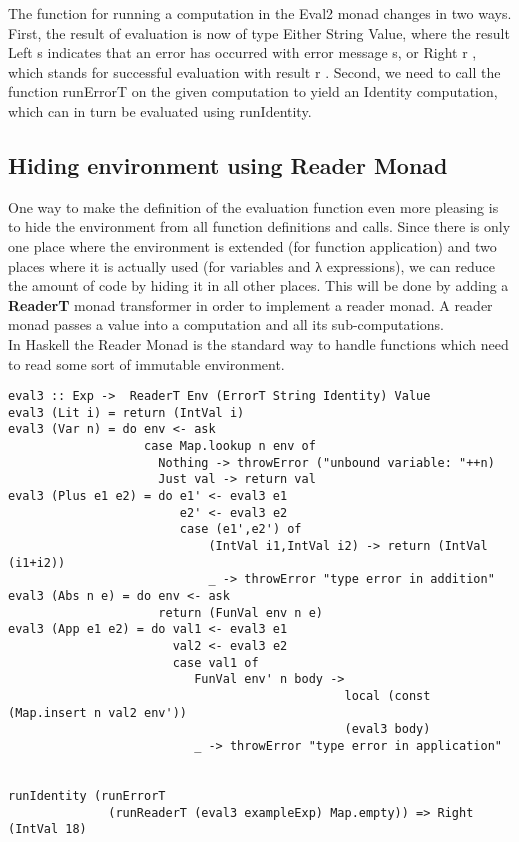 \documentclass[a4paper,10pt]{article}
\begin{document}

The function for running a computation in the Eval2 monad changes in two ways. First,
the result of evaluation is now of type Either String Value, where the result Left s indicates that an
error has occurred with error message s, or Right r , which stands for successful evaluation with
result r . Second, we need to call the function runErrorT on the given computation to yield an
Identity computation, which can in turn be evaluated using runIdentity.
\\

\newpage
\subsection{Hiding environment using Reader Monad}
One way to make the definition of the evaluation function even more pleasing is to hide the
environment from all function definitions and calls. Since there is only one place where the
environment is extended (for function application) and two places where it is actually used (for
variables and λ expressions), we can reduce the amount of code by hiding it in all other places.
This will be done by adding a \textbf{ReaderT} monad transformer in order to implement a reader
monad. A reader monad passes a value into a computation and all its sub-computations.
\\
In Haskell the Reader Monad is the standard way to handle functions which need to read some sort of immutable environment.

\begin{verbatim}
eval3 :: Exp ->  ReaderT Env (ErrorT String Identity) Value 
eval3 (Lit i) = return (IntVal i)
eval3 (Var n) = do env <- ask
                   case Map.lookup n env of
                     Nothing -> throwError ("unbound variable: "++n) 
                     Just val -> return val
eval3 (Plus e1 e2) = do e1' <- eval3 e1
                        e2' <- eval3 e2
                        case (e1',e2') of
                            (IntVal i1,IntVal i2) -> return (IntVal (i1+i2))
                            _ -> throwError "type error in addition"
eval3 (Abs n e) = do env <- ask
                     return (FunVal env n e)
eval3 (App e1 e2) = do val1 <- eval3 e1
                       val2 <- eval3 e2
                       case val1 of
                          FunVal env' n body -> 
                                               local (const (Map.insert n val2 env')) 
                                               (eval3 body)
                          _ -> throwError "type error in application"				 


runIdentity (runErrorT 
              (runReaderT (eval3 exampleExp) Map.empty)) => Right (IntVal 18)
\end{verbatim}
\end{document}
